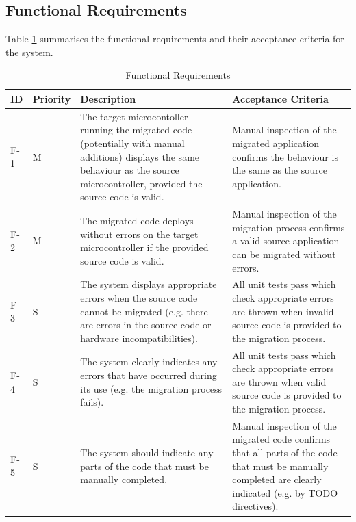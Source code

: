 \documentclass{UoYCSproject}
\newcommand{\ra}[1]{\renewcommand{\arraystretch}{#1}}
\begin{document}
\subsection{Functional Requirements}
Table \ref{table:func_req} summarises the functional requirements and their acceptance criteria for the system.
\begin{table}[h!]\centering
\ra{1.3}
  \begin{tabular}{@{}p{}p{}p{}p{}@{}} \toprule 
  \textbf{ID} & \textbf{Priority} & \textbf{Description} & \textbf{Acceptance Criteria} \\
  \midrule
  F-1 & M & The target microcontoller running the migrated code (potentially with manual additions) displays the same behaviour as the source microcontroller, provided the source code is valid. & Manual inspection of the migrated application confirms the behaviour is the same as the source application. \\
  F-2 & M & The migrated code deploys without errors on the target microcontroller if the provided source code is valid. & Manual inspection of the migration process confirms a valid source application can be migrated without errors. \\
  F-3 & S & The system displays appropriate errors when the source code cannot be migrated (e.g. there are errors in the source code or hardware incompatibilities). & All unit tests pass which check appropriate errors are thrown when invalid source code is provided to the migration process. \\  
  F-4 & S & The system clearly indicates any errors that have occurred during its use (e.g. the migration process fails). & All unit tests pass which check appropriate errors are thrown when valid source code is provided to the migration process.\\
  F-5 & S & The system should indicate any parts of the code that must be manually completed. & Manual inspection of the migrated code confirms that all parts of the code that must be manually completed are clearly indicated (e.g. by TODO directives). \\
  \bottomrule
  \end{tabular}
\caption{Functional Requirements}
\label{table:func_req}
\end{table}
\end{document}
